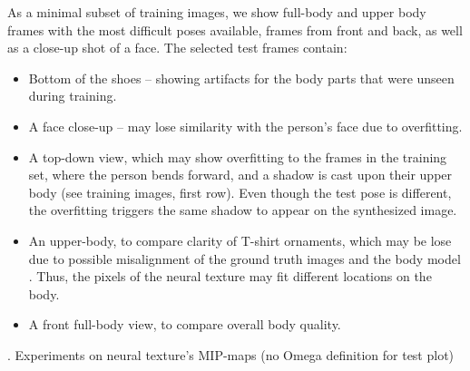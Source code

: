 As a minimal subset of training images, we show full-body and upper body frames with the most difficult poses available, frames from front and back, as well as a close-up shot of a face. The selected test frames contain:
\begin{itemize}
	\item Bottom of the shoes -- showing artifacts for the body parts that were unseen during training.
	\item A face close-up -- may lose similarity with the person's face due to overfitting.
	\item A top-down view, which may show overfitting to the frames in the training set, where the person bends forward, and a shadow is cast upon their upper body (see training images, first row). Even though the test pose is different, the overfitting triggers the same shadow to appear on the synthesized image.
	\item An upper-body, to compare clarity of T-shirt ornaments, which may be lose due to possible misalignment of the ground truth images and the body model \cite{dnn:smplx19}. Thus, the pixels of the neural texture may fit different locations on the body.
	\item A front full-body view, to compare overall body quality.
\end{itemize}

\setcounter{experiments-group}{1}

\clearpage
\newpage
{}. \alert{Experiments on neural texture's MIP-maps (no Omega definition for test plot)}


